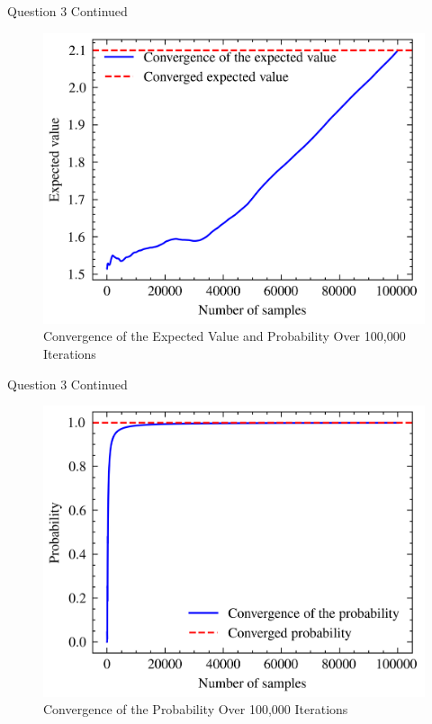 \documentclass[compress,12pt]{beamer}
\begin{document}
\begin{frame}{Question 3 Continued}
    \begin{figure}
        \centering
        \includegraphics{imgs/convergence2.png}
        \caption{Convergence of the Expected Value and Probability Over 100,000 Iterations}
    \end{figure}

\end{frame}

\begin{frame}{Question 3 Continued}
    \begin{figure}
        \centering
        \includegraphics{imgs/probabilityconvergence.png}
        \caption{Convergence of the Probability Over 100,000 Iterations}
    \end{figure}

\end{frame}
\end{document}
